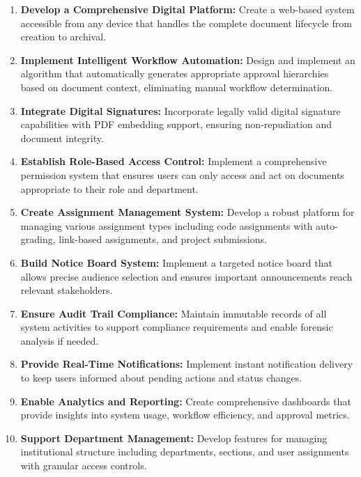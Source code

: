 \begin{enumerate}[itemsep=5pt]
\item \textbf{Develop a Comprehensive Digital Platform:} Create a web-based system accessible from any device that handles the complete document lifecycle from creation to archival.

\item \textbf{Implement Intelligent Workflow Automation:} Design and implement an algorithm that automatically generates appropriate approval hierarchies based on document context, eliminating manual workflow determination.

\item \textbf{Integrate Digital Signatures:} Incorporate legally valid digital signature capabilities with PDF embedding support, ensuring non-repudiation and document integrity.

\item \textbf{Establish Role-Based Access Control:} Implement a comprehensive permission system that ensures users can only access and act on documents appropriate to their role and department.

\item \textbf{Create Assignment Management System:} Develop a robust platform for managing various assignment types including code assignments with auto-grading, link-based assignments, and project submissions.

\item \textbf{Build Notice Board System:} Implement a targeted notice board that allows precise audience selection and ensures important announcements reach relevant stakeholders.

\item \textbf{Ensure Audit Trail Compliance:} Maintain immutable records of all system activities to support compliance requirements and enable forensic analysis if needed.

\item \textbf{Provide Real-Time Notifications:} Implement instant notification delivery to keep users informed about pending actions and status changes.

\item \textbf{Enable Analytics and Reporting:} Create comprehensive dashboards that provide insights into system usage, workflow efficiency, and approval metrics.

\item \textbf{Support Department Management:} Develop features for managing institutional structure including departments, sections, and user assignments with granular access controls.
\end{enumerate}

